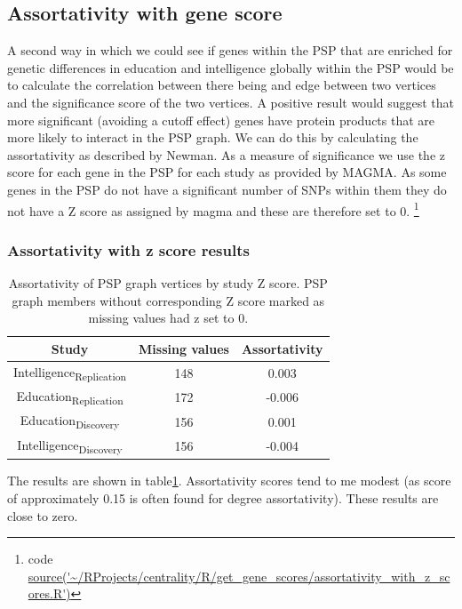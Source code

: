 \subsection{Assortativity with gene score}
 
A second way in which we could see if genes within the PSP that are enriched for genetic differences in education and intelligence globally within the PSP would be to calculate the correlation between there being and edge between two vertices and the significance score of the two vertices. A positive result would suggest that more significant (avoiding a cutoff effect) genes have protein products that are more likely to interact in the PSP graph. We can do this by calculating the assortativity as described by Newman. As a measure of significance we use the z score for each gene in the PSP for each study as provided by MAGMA. As some genes in the PSP do not have a significant number of SNPs within them they do not have a Z score as assigned by magma and these are therefore set to 0. \footnote{code \url{source('~/RProjects/centrality/R/get_gene_scores/assortativity_with_z_scores.R')} }

\subsubsection{Assortativity with z score results}
 
 \begin{table}[]
     \centering
     \begin{tabular}{ccc}
     \toprule
         Study & Missing values  & Assortativity\\
         \midrule
         Intelligence\textsubscript{Replication} & 148 & 0.003\\
         Education\textsubscript{Replication} & 172 & -0.006\\
         Education\textsubscript{Discovery} & 156 & 0.001\\
         Intelligence\textsubscript{Discovery} & 156 & -0.004\\
         \bottomrule
     \end{tabular}
     \caption{Assortativity of PSP graph vertices by study Z score. PSP graph members without corresponding Z score marked as missing values had z set to 0.}
     \label{tab:Assortativity of PSP graph and z scores}
 \end{table}


The results are shown in table\ref{tab:Assortativity of PSP graph and z scores}. Assortativity scores tend to me modest (as score of approximately 0.15 is often found for degree assortativity). These results are close to zero. 

